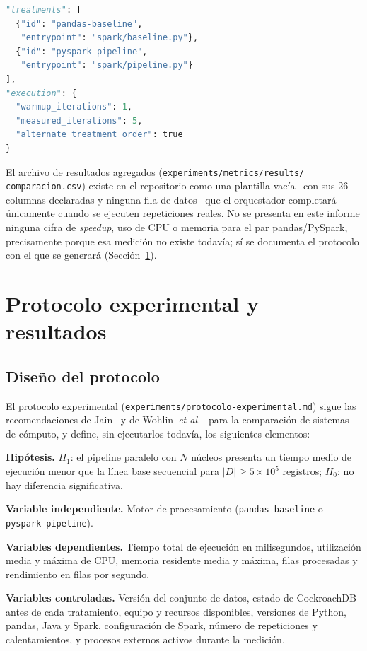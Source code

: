 \documentclass[10pt,twocolumn]{article}
\begin{document}
\begin{lstlisting}[language=Python,caption={Firma de los tratamientos configurados en \texttt{experiment-config.json}.},label={lst:orquestador}]
"treatments": [
  {"id": "pandas-baseline",
   "entrypoint": "spark/baseline.py"},
  {"id": "pyspark-pipeline",
   "entrypoint": "spark/pipeline.py"}
],
"execution": {
  "warmup_iterations": 1,
  "measured_iterations": 5,
  "alternate_treatment_order": true
}
\end{lstlisting}

El archivo de resultados agregados (\texttt{experiments/metrics/results/
comparacion.csv}) existe en el repositorio como una plantilla vacía --con
sus 26 columnas declaradas y ninguna fila de datos-- que el orquestador
completará únicamente cuando se ejecuten repeticiones reales. No se
presenta en este informe ninguna cifra de \emph{speedup}, uso de CPU o
memoria para el par pandas/PySpark, precisamente porque esa medición no
existe todavía; sí se documenta el protocolo con el que se generará
(Sección~\ref{sec:protocolo}).

\section{Protocolo experimental y resultados}
\label{sec:protocolo}

\subsection{Diseño del protocolo}

El protocolo experimental (\texttt{experiments/protocolo-experimental.md})
sigue las recomendaciones de Jain~\cite{baltes2022sampling} y de
Wohlin~\emph{et al.}~\cite{verdecchia2023} para la comparación de sistemas de
cómputo, y define, sin ejecutarlos todavía, los siguientes elementos:

\textbf{Hipótesis.} $H_1$: el pipeline paralelo con $N$ núcleos presenta un
tiempo medio de ejecución menor que la línea base secuencial para
$|D| \geq 5\times10^5$ registros; $H_0$: no hay diferencia significativa.

\textbf{Variable independiente.} Motor de procesamiento
(\texttt{pandas-baseline} o \texttt{pyspark-pipeline}).

\textbf{Variables dependientes.} Tiempo total de ejecución en milisegundos,
utilización media y máxima de CPU, memoria residente media y máxima, filas
procesadas y rendimiento en filas por segundo.

\textbf{Variables controladas.} Versión del conjunto de datos, estado de
CockroachDB antes de cada tratamiento, equipo y recursos disponibles,
versiones de Python, pandas, Java y Spark, configuración de Spark, número
de repeticiones y calentamientos, y procesos externos activos durante la
medición.
\end{document}
